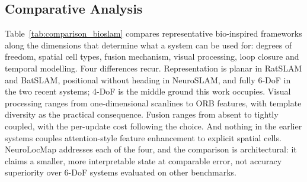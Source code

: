 \subsection{Comparative Analysis}
\label{sec:related_compare}

Table~\ref{tab:comparison_bioslam} compares representative bio-inspired frameworks along the dimensions that determine what a system can be used for: degrees of freedom, spatial cell types, fusion mechanism, visual processing, loop closure and temporal modelling. Four differences recur. Representation is planar in RatSLAM and BatSLAM, positional without heading in NeuroSLAM, and fully 6-DoF in the two recent systems; 4-DoF is the middle ground this work occupies. Visual processing ranges from one-dimensional scanlines to ORB features, with template diversity as the practical consequence. Fusion ranges from absent to tightly coupled, with the per-update cost following the choice. And nothing in the earlier systems couples attention-style feature enhancement to explicit spatial cells. NeuroLocMap addresses each of the four, and the comparison is architectural: it claims a smaller, more interpretable state at comparable error, not accuracy superiority over 6-DoF systems evaluated on other benchmarks.

